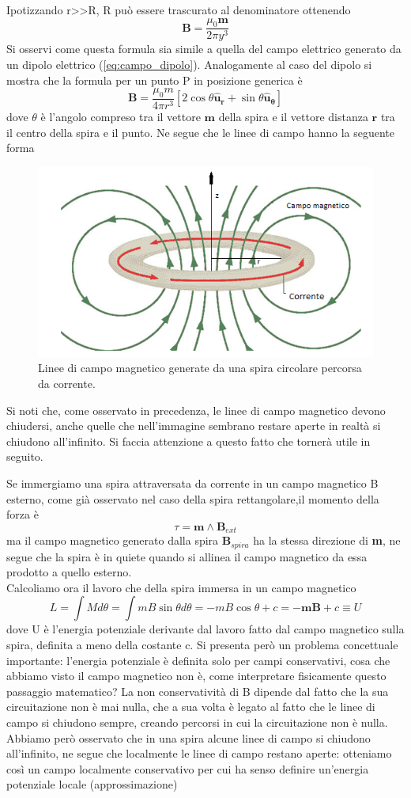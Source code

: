 \documentclass[
10pt, %
a4paper, %
oneside, %
headinclude,footinclude, %
BCOR5mm, %
]{scrartcl}
\begin{document}
\begin{esercizio}
Ipotizzando r>>R, R può essere trascurato al denominatore ottenendo 
\[\mathbf{B}=\frac{\mu_0 \mathbf{m}}{2\pi y^{3}}\]
Si osservi come questa formula sia simile a quella del campo elettrico generato da un dipolo elettrico (\ref{eq:campo_dipolo}). Analogamente al caso del dipolo si mostra che la formula per un punto P in posizione generica è  
\[\mathbf{B}=\frac{\mu_0 m }{4\pi r^3}[2\cos\theta\mathbf{\hat{u}_r}+\sin\theta\mathbf{\hat{u}_{\theta}}]\]
dove $\theta$ è l'angolo compreso tra il vettore \(\mathbf{m}\) della spira e il vettore distanza \(\mathbf{r}\) tra il centro della spira e il punto. Ne segue che le linee di campo hanno la seguente forma
\begin{figure}[h!]
	\centering
	\includegraphics[width=0.7\linewidth]{images/linee_campo_magnetico_spira}
	\caption{Linee di campo magnetico generate da una spira circolare percorsa da corrente.}
	\label{fig:lineecampomagneticospira}
\end{figure}
\FloatBarrier
Si noti che, come osservato in precedenza, le linee di campo magnetico devono chiudersi, anche quelle che nell'immagine sembrano restare aperte in realtà si chiudono all'infinito. Si faccia attenzione a questo fatto che tornerà utile in seguito.  
\end{esercizio}
Se immergiamo una spira attraversata da corrente in un campo magnetico B esterno, come già osservato nel caso della spira rettangolare,il momento della forza è 
\[\tau = \mathbf{m}\wedge\mathbf{B}_{ext}\]
ma il campo magnetico generato dalla spira \(\mathbf{B}_{spira}\) ha la stessa direzione di \textbf{m}, ne segue che la spira è in quiete quando si allinea il campo magnetico da essa prodotto a quello esterno.\\
Calcoliamo ora il lavoro che della spira immersa in un campo magnetico
\[L = \int M d\theta= \int m B \sin\theta d\theta= -mB\cos\theta + c= -\mathbf{m}\mathbf{B}+c \equiv U\]
dove U è l'energia potenziale derivante dal lavoro fatto dal campo magnetico sulla spira, definita a meno della costante c. Si presenta però un problema concettuale importante: l'energia potenziale è definita solo per campi conservativi, cosa che abbiamo visto il campo magnetico non è, come interpretare fisicamente questo passaggio matematico? La non conservatività di B dipende dal fatto che la sua circuitazione non è mai nulla, che a sua volta è legato al fatto che le linee di campo si chiudono sempre, creando percorsi in cui la circuitazione non è nulla. Abbiamo però osservato che in una spira alcune linee di campo si chiudono all'infinito, ne segue che localmente le linee di campo restano aperte: otteniamo così un campo localmente conservativo per cui ha senso definire un'energia potenziale locale (approssimazione)\\ 
\end{document}
